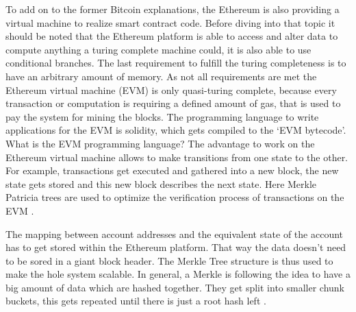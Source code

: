 To add on to the former Bitcoin explanations, the Ethereum is also providing a virtual machine to realize smart contract code. 
Before diving into that topic it should be noted that the Ethereum platform is able to access and alter data to compute anything a turing complete machine could, it is also able to use conditional branches. 
The last requirement to fulfill the turing completeness is to have an arbitrary amount of memory. 
As not all requirements are met the Ethereum virtual machine (EVM) is only quasi-turing complete, because every transaction or computation is requiring a defined amount of gas, that is used to pay the system for mining the blocks. 
The programming language to write applications for the EVM is solidity, which gets compiled to the ‘EVM bytecode’. 
What is the EVM programming language?
The advantage to work on the Ethereum virtual machine allows to make transitions from one state to the other. For example, transactions get executed and gathered into a new block, the new state gets stored and this new block describes the next state.
Here Merkle Patricia trees are used to optimize the verification process of transactions on the EVM \cite{Bisade2018}.

The mapping between account addresses and the equivalent state of the account has to get stored within the Ethereum platform. That way the data doesn’t need to be sored in a giant block header.
The Merkle Tree structure is thus used to make the hole system scalable. 
In general, a Merkle is following the idea to have a big amount of data which are hashed together. 
They get split into smaller chunk buckets, this gets repeated until there is just a root hash left \cite{Buterin2015}.

